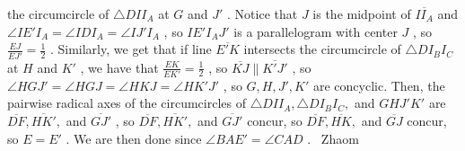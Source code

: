 \documentclass[12pt]{article}
\begin{document}
the circumcircle of $\triangle{}DII_A$ at $G$ and $J'$ . Notice that $J$ is the midpoint of $\overline{II_A}$ and $\angle{}IE'I_A=\angle{}IDI_A=\angle{}IJ'I_A$ , so $IE'I_AJ'$ is a parallelogram with center $J$ , so $\tfrac{EJ}{EJ'}=\tfrac{1}{2}$ . Similarly, we get that if line $\overline{E'K}$ intersects the circumcircle of $\triangle{}DI_BI_C$ at $H$ and $K'$ , we have that $\tfrac{EK}{EK'}=\tfrac{1}{2}$ , so $\overline{KJ}\parallel\overline{K'J'}$ , so $\angle{}HGJ'=\angle{}HGJ=\angle{}HKJ=\angle{}HK'J'$ , so $G,H,J',K'$ are concyclic. Then, the pairwise radical axes of the circumcircles of $\triangle{}DII_A,\triangle{}DI_BI_C,$ and $GHJ'K'$ are $\overline{DF},\overline{HK'},$ and $\overline{GJ'}$ , so $\overline{DF},\overline{HK'},$ and $\overline{GJ'}$ concur, so $\overline{DF},\overline{HK},$ and $\overline{GJ}$ concur, so $E=E'$ . We are then done since $\angle{}BAE'=\angle{}CAD$ . ~Zhaom
\end{document}
